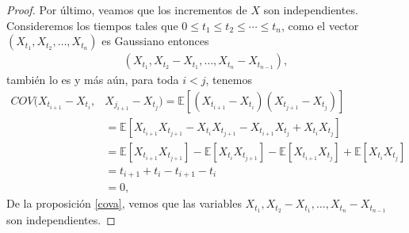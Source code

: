 \begin{proof}
Por último, veamos que los incrementos de $X$ son independientes. Consideremos los tiempos tales que $0 \leq t_1 \leq t_2 \leq \cdots \leq t_n$, como el vector $(X_{t_1}, X_{t_2}, \ldots, X_{t_n})$ es Gaussiano entonces
  \begin{align*}
  	(X_{t_1}, X_{t_2} - X_{t_1}, \ldots, X_{t_n} - X_{t_{n-1}}),
  \end{align*}
también lo es y más aún, para toda $i < j$, tenemos
  \begin{align*}
  	COV(X_{t_{i + 1}} - X_{t_i}, & X_{j_{i + 1}}  - X_{t_j}) = \mathbb{E} [(X_{t_{i + 1}} - X_{t_i})(X_{t_{j + 1}} - X_{t_j})] \\ %
    & = \mathbb{E} [X_{t_{i + 1}}X_{t_{j + 1}} - X_{t_i}X_{t_{j + 1}} - X_{t_{i + 1}}X_{t_j} + X_{t_i}X_{t_j}] \\
    & = \mathbb{E} [X_{t_{i + 1}}X_{t_{j + 1}}] - \mathbb{E}[X_{t_i}X_{t_{j + 1}}] - \mathbb{E}[X_{t_{i + 1}}X_{t_j}] + \mathbb{E}[X_{t_i}X_{t_j}] \\
    & = t_{i+1} + t_i - t_{i+1} - t_i \\
    & = 0,
  \end{align*}
De la proposición \ref{cova}, vemos que las variables $X_{t_1}, X_{t_2} - X_{t_1}, \ldots, X_{t_n} - X_{t_{n-1}}$ son independientes.
\end{proof}


